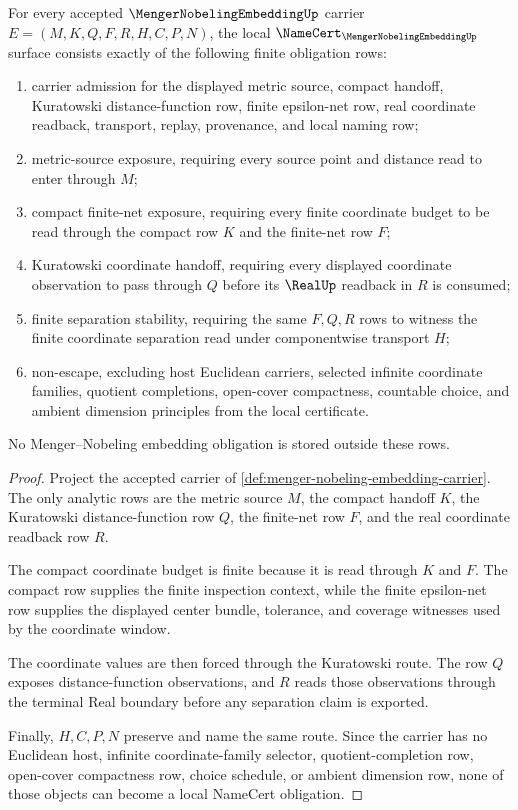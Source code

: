 \begin{theorem}
\label{thm:menger-nobeling-embedding-namecert-obligations}
For every accepted $\MengerNobelingEmbeddingUp$ carrier $E=(M,K,Q,F,R,H,C,P,N)$, the local $\NameCert_{\MengerNobelingEmbeddingUp}$ surface consists exactly of the following finite obligation rows:
\begin{enumerate}
\item carrier admission for the displayed metric source, compact handoff, Kuratowski distance-function row, finite epsilon-net row, real coordinate readback, transport, replay, provenance, and local naming row;
\item metric-source exposure, requiring every source point and distance read to enter through $M$;
\item compact finite-net exposure, requiring every finite coordinate budget to be read through the compact row $K$ and the finite-net row $F$;
\item Kuratowski coordinate handoff, requiring every displayed coordinate observation to pass through $Q$ before its $\RealUp$ readback in $R$ is consumed;
\item finite separation stability, requiring the same $F,Q,R$ rows to witness the finite coordinate separation read under componentwise transport $H$;
\item non-escape, excluding host Euclidean carriers, selected infinite coordinate families, quotient completions, open-cover compactness, countable choice, and ambient dimension principles from the local certificate.
\end{enumerate}
No Menger--Nobeling embedding obligation is stored outside these rows.
\end{theorem}
\begin{proof}
Project the accepted carrier of \autoref{def:menger-nobeling-embedding-carrier}. The only analytic rows are the metric source $M$, the compact handoff $K$, the Kuratowski distance-function row $Q$, the finite-net row $F$, and the real coordinate readback row $R$.

The compact coordinate budget is finite because it is read through $K$ and $F$. The compact row supplies the finite inspection context, while the finite epsilon-net row supplies the displayed center bundle, tolerance, and coverage witnesses used by the coordinate window.

The coordinate values are then forced through the Kuratowski route. The row $Q$ exposes distance-function observations, and $R$ reads those observations through the terminal Real boundary before any separation claim is exported.

Finally, $H,C,P,N$ preserve and name the same route. Since the carrier has no Euclidean host, infinite coordinate-family selector, quotient-completion row, open-cover compactness row, choice schedule, or ambient dimension row, none of those objects can become a local NameCert obligation.
\end{proof}

